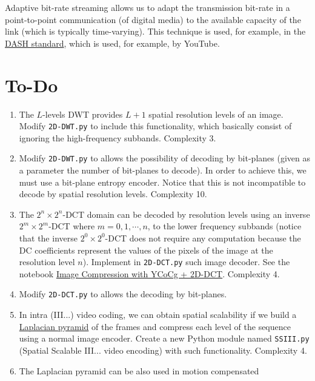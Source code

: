 Adaptive bit-rate streaming allows us to adapt the transmission bit-rate
in a point-to-point communication (of digital media) to the available
capacity of the link (which is typically time-varying). This
technique is used, for example, in the
\href{https://en.wikipedia.org/wiki/Dynamic_Adaptive_Streaming_over_HTTP}{DASH
  standard}, which is used, for example, by YouTube.


\section{To-Do}
\begin{enumerate}
\item The $L$-levels DWT provides $L+1$ spatial resolution levels of
  an image. Modify \texttt{2D-DWT.py} to include this functionality,
  which basically consist of ignoring the high-frequency
  subbands. Complexity 3.
\item Modify \texttt{2D-DWT.py} to allows the possibility of decoding
  by bit-planes (given as a parameter the number of bit-planes to
  decode). In order to achieve this, we must use a bit-plane entropy
  encoder. Notice that this is not incompatible to decode by spatial
  resolution levels. Complexity 10.
\item The $2^n\times 2^n$-DCT domain can be decoded by resolution
  levels using an inverse $2^m\times 2^m$-DCT where $m=0,1,\cdots,n$,
  to the lower frequency subbands (notice that the inverse
  $2^0\times 2^0$-DCT does not require any computation because the DC
  coefficients represent the values of the pixels of the image at the
  resolution level $n$). Implement in \texttt{2D-DCT.py} such image
  decoder. See the notebook
  \href{https://github.com/vicente-gonzalez-ruiz/DCT2D/blob/master/docs/YCoCg_2D_DCT_SQ.ipynb}{Image
    Compression with YCoCg + 2D-DCT}. Complexity 4.
\item Modify \texttt{2D-DCT.py} to allows the decoding by bit-planes.
\item In intra (III...) video coding, we can obtain spatial
  scalability if we build a
  \href{https://en.wikipedia.org/wiki/Pyramid_(image_processing)#Laplacian_pyramid}{Laplacian
    pyramid} of the frames and compress each level of the sequence
  using a normal image encoder. Create a new Python module named
  \texttt{SSIII.py} (Spatial Scalable III... video encoding) with such
  functionality. Complexity 4.
\item The Laplacian pyramid can be also used in motion compensated

\end{enumerate}
